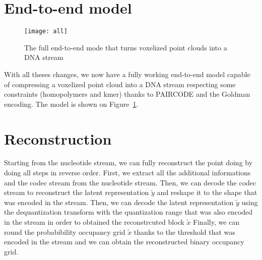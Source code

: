 \section{End-to-end model}

\begin{figure}
    \centering
    \texttt{[image: all]}
    \caption{The full end-to-end mode that turns voxelized point clouds into a DNA stream}
    \label{fig:end-to-end}
\end{figure}

With all theses changes, we now have a fully working end-to-end model capable of compressing a voxelized point cloud into a DNA stream respecting some constraints (homopolymers and kmer) thanks to PAIRCODE and the Goldman encoding. The model is shown on Figure~\ref{fig:end-to-end}.

\section{Reconstruction}

Starting from the nucleotide stream, we can fully reconstruct the point doing by doing all steps in reverse order.
First, we extract all the additional informations and the codec stream from the nucleotide stream. Then, we can decode the codec stream to reconstruct the latent representation $\tilde{y}$ and reshape it to the shape that was encoded in the stream.
Then, we can decode the latent representation $\tilde{y}$ using the dequantization transform with the quantization range that was also encoded in the stream in order to obtained the reconstrcuted block $\tilde{x}$
Finally, we can round the probabibility occupancy grid $\tilde{x}$ thanks to the threshold that was encoded in the stream and we can obtain the reconstructed binary occupancy grid.
